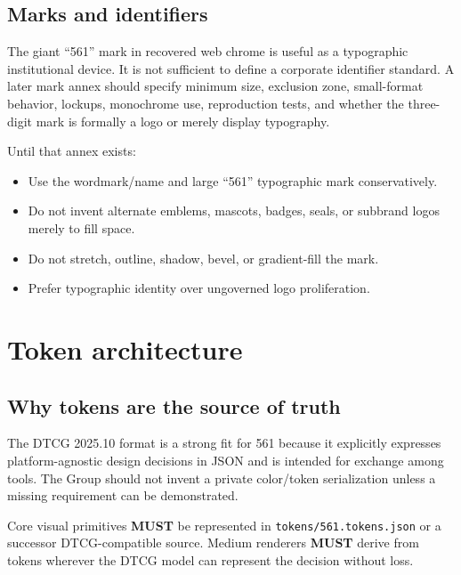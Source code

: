 \documentclass[11pt,twoside,openany]{report}
\newcommand{\MUST}{\textbf{MUST}\xspace}
\begin{document}
\section{Marks and identifiers}
The giant ``561'' mark in recovered web chrome is useful as a typographic institutional device. It is not sufficient to define a corporate identifier standard. A later mark annex should specify minimum size, exclusion zone, small-format behavior, lockups, monochrome use, reproduction tests, and whether the three-digit mark is formally a logo or merely display typography.

Until that annex exists:
\begin{itemize}
  \item Use the wordmark/name and large ``561'' typographic mark conservatively.
  \item Do not invent alternate emblems, mascots, badges, seals, or subbrand logos merely to fill space.
  \item Do not stretch, outline, shadow, bevel, or gradient-fill the mark.
  \item Prefer typographic identity over ungoverned logo proliferation.
\end{itemize}

\clearpage
\chapter{Token architecture}

\section{Why tokens are the source of truth}
The DTCG 2025.10 format is a strong fit for 561 because it explicitly expresses platform-agnostic design decisions in JSON and is intended for exchange among tools. The Group should not invent a private color/token serialization unless a missing requirement can be demonstrated.

\begin{specbox}
Core visual primitives \MUST be represented in \texttt{tokens/561.tokens.json} or a successor DTCG-compatible source. Medium renderers \MUST derive from tokens wherever the DTCG model can represent the decision without loss.
\end{specbox}
\end{document}
